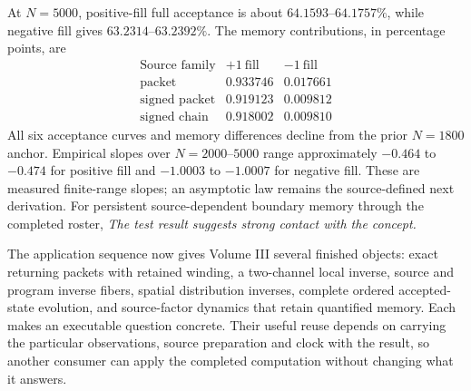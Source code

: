 At $N=5000$, positive-fill full acceptance is about $64.1593$--$64.1757\%$, while negative fill gives $63.2314$--$63.2392\%$. The memory contributions, in percentage points, are
\[
\begin{array}{l|rr}
 \text{Source family}&+1\ \text{fill}&-1\ \text{fill}\\\hline
 \text{packet}&0.933746&0.017661\\
 \text{signed packet}&0.919123&0.009812\\
 \text{signed chain}&0.918002&0.009810
\end{array}
\]
All six acceptance curves and memory differences decline from the prior $N=1800$ anchor. Empirical slopes over $N=2000$--$5000$ range approximately $-0.464$ to $-0.474$ for positive fill and $-1.0003$ to $-1.0007$ for negative fill. These are measured finite-range slopes; an asymptotic law remains the source-defined next derivation. For persistent source-dependent boundary memory through the completed roster, \emph{The test result suggests strong contact with the concept.}

The application sequence now gives Volume III several finished objects: exact returning packets with retained winding, a two-channel local inverse, source and program inverse fibers, spatial distribution inverses, complete ordered accepted-state evolution, and source-factor dynamics that retain quantified memory. Each makes an executable question concrete. Their useful reuse depends on carrying the particular observations, source preparation and clock with the result, so another consumer can apply the completed computation without changing what it answers.
